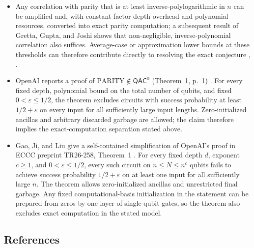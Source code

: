 \begin{itemize}
  \item Any correlation with parity that is at least inverse-polylogarithmic in
$n$ can be amplified and, with constant-factor depth overhead and
polynomial resources, converted into exact parity computation; a subsequent
result of Gretta, Gupta, and Joshi shows that non-negligible,
inverse-polynomial correlation also suffices.  Average-case or
approximation lower bounds at these thresholds can therefore contribute
directly to resolving the exact conjecture
,
.

  \item OpenAI reports a proof of $\mathrm{PARITY}\notin\mathsf{QAC}^0$
  (Theorem~1, p.~1) . For every
  fixed depth, polynomial bound on the total number of qubits, and fixed
  $0<\varepsilon\leq1/2$, the theorem excludes circuits with success
  probability at least $1/2+\varepsilon$ on every input for all sufficiently
  large input lengths. Zero-initialized ancillas and arbitrary discarded
  garbage are allowed; the claim therefore implies the exact-computation
  separation stated above.

  \item Gao, Ji, and Liu give a self-contained simplification of OpenAI's proof in
ECCC preprint TR26-258, Theorem~1 .
For every fixed depth $d$, exponent $c\geq1$, and $0<\varepsilon\leq1/2$,
every such circuit on $n\leq N\leq n^c$ qubits fails to achieve success
probability $1/2+\varepsilon$ on at least one input for all sufficiently
large $n$.
The theorem allows zero-initialized ancillas and unrestricted final garbage.
Any fixed computational-basis initialization in the statement can be prepared
from zeros by one layer of single-qubit gates, so the theorem also excludes
exact computation in the stated model.
\end{itemize}

\subsection*{References}

